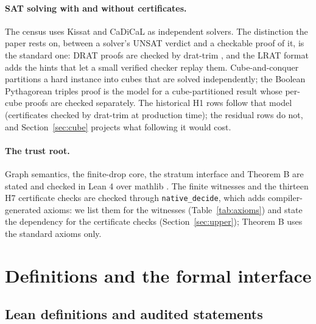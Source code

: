 \documentclass{anvil-paper}
\theoremstyle{definition}
\begin{document}
\paragraph{SAT solving with and without certificates.} The census uses Kissat \citep{biere2024kissat} and CaDiCaL \citep{biere2020cadical} as independent solvers. The distinction the paper rests on, between a solver's UNSAT verdict and a checkable proof of it, is the standard one: DRAT proofs are checked by drat-trim \citep{wetzler2014drat}, and the LRAT format \citep{cruzfilipe2017lrat} adds the hints that let a small verified checker replay them. Cube-and-conquer \citep{heule2011cube} partitions a hard instance into cubes that are solved independently; the Boolean Pythagorean triples proof \citep{heule2016pythagorean} is the model for a cube-partitioned result whose per-cube proofs are checked separately. The historical H1 rows follow that model (certificates checked by drat-trim at production time); the residual rows do not, and Section~\ref{sec:cube} projects what following it would cost.

\paragraph{The trust root.} Graph semantics, the finite-drop core, the stratum interface and Theorem B are stated and checked in Lean 4 \citep{moura2021lean4} over mathlib \citep{mathlib2020}. The finite witnesses and the thirteen H7 certificate checks are checked through \texttt{native\_decide}, which adds compiler-generated axioms: we list them for the witnesses (Table~\ref{tab:axioms}) and state the dependency for the certificate checks (Section~\ref{sec:upper}); Theorem B uses the standard axioms only.

\section{Definitions and the formal interface}\label{sec:prelim}

\subsection{Lean definitions and audited statements}\label{sec:lean-defs}
\end{document}
